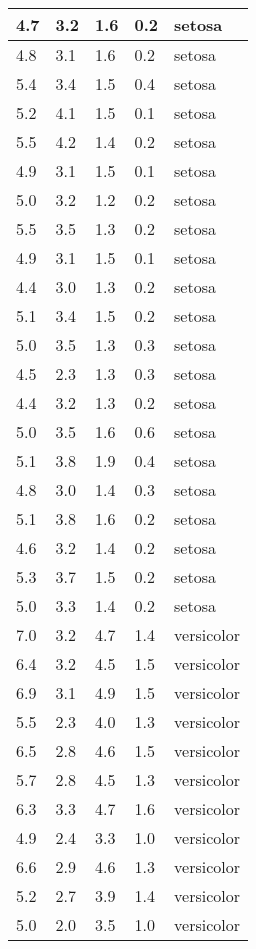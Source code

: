 \begin{table}
\begin{tabular}{|l|l|l|l|l|}
4.7 & 3.2 & 1.6 & 0.2 & setosa \\ \hline
4.8 & 3.1 & 1.6 & 0.2 & setosa \\ \hline
5.4 & 3.4 & 1.5 & 0.4 & setosa \\ \hline
5.2 & 4.1 & 1.5 & 0.1 & setosa \\ \hline
5.5 & 4.2 & 1.4 & 0.2 & setosa \\ \hline
4.9 & 3.1 & 1.5 & 0.1 & setosa \\ \hline
5.0 & 3.2 & 1.2 & 0.2 & setosa \\ \hline
5.5 & 3.5 & 1.3 & 0.2 & setosa \\ \hline
4.9 & 3.1 & 1.5 & 0.1 & setosa \\ \hline
4.4 & 3.0 & 1.3 & 0.2 & setosa \\ \hline
5.1 & 3.4 & 1.5 & 0.2 & setosa \\ \hline
5.0 & 3.5 & 1.3 & 0.3 & setosa \\ \hline
4.5 & 2.3 & 1.3 & 0.3 & setosa \\ \hline
4.4 & 3.2 & 1.3 & 0.2 & setosa \\ \hline
5.0 & 3.5 & 1.6 & 0.6 & setosa \\ \hline
5.1 & 3.8 & 1.9 & 0.4 & setosa \\ \hline
4.8 & 3.0 & 1.4 & 0.3 & setosa \\ \hline
5.1 & 3.8 & 1.6 & 0.2 & setosa \\ \hline
4.6 & 3.2 & 1.4 & 0.2 & setosa \\ \hline
5.3 & 3.7 & 1.5 & 0.2 & setosa \\ \hline
5.0 & 3.3 & 1.4 & 0.2 & setosa \\ \hline
7.0 & 3.2 & 4.7 & 1.4 & versicolor \\ \hline
6.4 & 3.2 & 4.5 & 1.5 & versicolor \\ \hline
6.9 & 3.1 & 4.9 & 1.5 & versicolor \\ \hline
5.5 & 2.3 & 4.0 & 1.3 & versicolor \\ \hline
6.5 & 2.8 & 4.6 & 1.5 & versicolor \\ \hline
5.7 & 2.8 & 4.5 & 1.3 & versicolor \\ \hline
6.3 & 3.3 & 4.7 & 1.6 & versicolor \\ \hline
4.9 & 2.4 & 3.3 & 1.0 & versicolor \\ \hline
6.6 & 2.9 & 4.6 & 1.3 & versicolor \\ \hline
5.2 & 2.7 & 3.9 & 1.4 & versicolor \\ \hline
5.0 & 2.0 & 3.5 & 1.0 & versicolor \\ \hline

\end{tabular}
\end{table}

